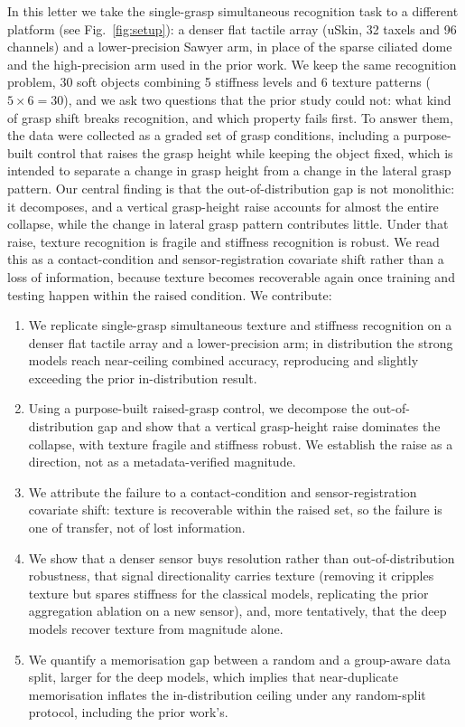 \documentclass[journal]{IEEEtran}
\begin{document}
%
%
%
In this letter we take the single-grasp simultaneous recognition task to a different platform (see Fig.~\ref{fig:setup}): a denser flat tactile array (uSkin, 32 taxels and 96 channels) and a lower-precision Sawyer arm, in place of the sparse ciliated dome and the high-precision arm used in the prior work. We keep the same recognition problem, 30 soft objects combining 5 stiffness levels and 6 texture patterns ($5 \times 6 = 30$), and we ask two questions that the prior study could not: what kind of grasp shift breaks recognition, and which property fails first. To answer them, the data were collected as a graded set of grasp conditions, including a purpose-built control that raises the grasp height while keeping the object fixed, which is intended to separate a change in grasp height from a change in the lateral grasp pattern.
%
%
Our central finding is that the out-of-distribution gap is not monolithic: it decomposes, and a vertical grasp-height raise accounts for almost the entire collapse, while the change in lateral grasp pattern contributes little. Under that raise, texture recognition is fragile and stiffness recognition is robust. We read this as a contact-condition and sensor-registration covariate shift rather than a loss of information, because texture becomes recoverable again once training and testing happen within the raised condition. We contribute:
%
\begin{enumerate}
    \item We replicate single-grasp simultaneous texture and stiffness recognition on a denser flat tactile array and a lower-precision arm; in distribution the strong models reach near-ceiling combined accuracy, reproducing and slightly exceeding the prior in-distribution result.
    \item Using a purpose-built raised-grasp control, we decompose the out-of-distribution gap and show that a vertical grasp-height raise dominates the collapse, with texture fragile and stiffness robust. We establish the raise as a direction, not as a metadata-verified magnitude.
    \item We attribute the failure to a contact-condition and sensor-registration covariate shift: texture is recoverable within the raised set, so the failure is one of transfer, not of lost information.
    \item We show that a denser sensor buys resolution rather than out-of-distribution robustness, that signal directionality carries texture (removing it cripples texture but spares stiffness for the classical models, replicating the prior aggregation ablation on a new sensor), and, more tentatively, that the deep models recover texture from magnitude alone.
    \item We quantify a memorisation gap between a random and a group-aware data split, larger for the deep models, which implies that near-duplicate memorisation inflates the in-distribution ceiling under any random-split protocol, including the prior work's.
\end{enumerate}
%
%
\end{document}
